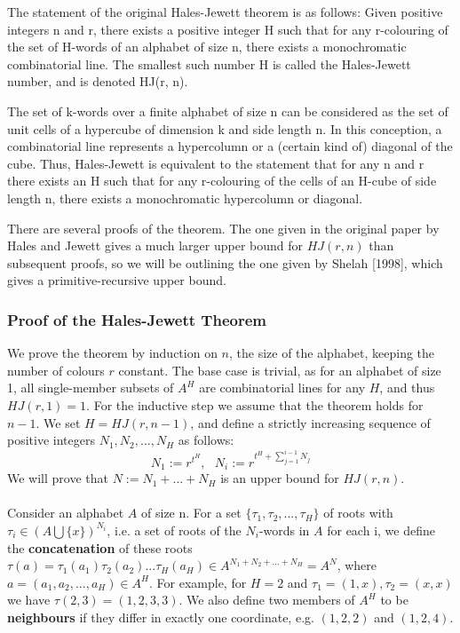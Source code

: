 \documentclass[11pt,a4paper]{article}
\begin{document}
The statement of the original Hales-Jewett theorem is as follows:
Given positive integers n and r, there exists a positive integer H such that for any r-colouring of the set of H-words of an alphabet of size n, there exists a monochromatic combinatorial line. The smallest such number H is called the Hales-Jewett number, and is denoted HJ(r, n).

The set of k-words over a finite alphabet of size n can be considered as the set of unit cells of a hypercube of dimension k and side length n. In this conception, a combinatorial line represents a hypercolumn or a (certain kind of) diagonal of the cube. Thus, Hales-Jewett is equivalent to the statement that for any n and r there exists an H such that for any r-colouring of the cells of an H-cube of side length n, there exists a monochromatic hypercolumn or diagonal.

There are several proofs of the theorem. The one given in the original paper by Hales and Jewett gives a much larger upper bound for $HJ(r, n)$ than subsequent proofs, so we will be outlining the one given by Shelah [1998], which gives a primitive-recursive upper bound.

\subsubsection*{Proof of the Hales-Jewett Theorem}
We prove the theorem by induction on $n$, the size of the alphabet, keeping the number of colours $r$ constant. The base case is trivial, as for an alphabet of size 1, all single-member subsets of $A^H$ are combinatorial lines for any $H$, and thus $HJ(r, 1) = 1$. For the inductive step we assume that the theorem holds for $n-1$.	We set $H = HJ(r, n-1)$, and define a strictly increasing sequence of positive integers $N_1, N_2, ... , N_H$ as follows:
$$
N_1 := r^{t^H}, \ \ \ 
N_i := r^{t^H + \sum_{j = 1}^{i - 1}{N_j}}
$$
We will prove that $N := N_1 + ... + N_H$ is an upper bound for $HJ(r, n)$.
\paragraph*{}
Consider an alphabet $A$ of size n. For a set $\{\tau_1, \tau_2, ..., \tau_H\}$ of roots with $\tau_i \in (A \bigcup \{x\})^{N_i}$, i.e. a set of roots of the $N_i$-words in $A$ for each i, we define the \textbf{concatenation} of these roots $\tau (a) = \tau_1(a_1) \tau_2 (a_2) ... \tau_H (a_H) \in A^{N_1 + N_2 + ... + N_H} = A^N$, where $a = (a_1, a_2, ..., a_H) \in A^H$. For example, for $H = 2$ and $\tau_1 = (1, x), \tau_2 = (x, x)$ we have $\tau (2, 3) = (1, 2, 3, 3)$.
We also define two members of $A^H$ to be \textbf{neighbours} if they differ in exactly one coordinate, e.g. $	(1, 2, 2)$ and $(1, 2, 4)$.
\end{document}
